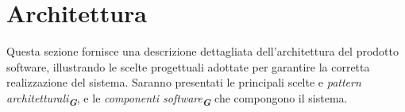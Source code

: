 

\section{Architettura}
\label{sec:architettura}

Questa sezione fornisce una descrizione dettagliata dell'architettura del prodotto software, illustrando le scelte progettuali adottate per garantire la corretta realizzazione del sistema. Saranno presentati le principali scelte e \emph{pattern architetturali}\textsubscript{\textbf{\textit{G}}}, e le \emph{componenti software}\textsubscript{\textbf{\textit{G}}} che compongono il sistema.

